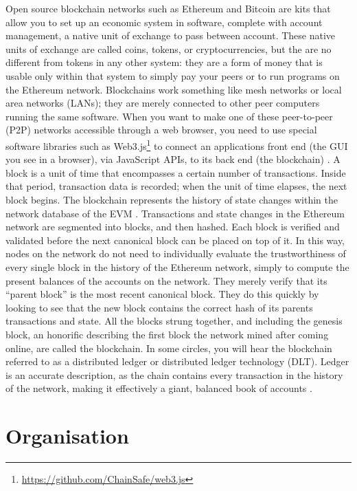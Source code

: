 Open source blockchain networks such as Ethereum and Bitcoin are kits that allow you to set up an economic system in software, complete with account management, a native unit of exchange to pass between account. These native units of exchange are called coins, tokens, or cryptocurrencies, but the are no different from tokens in any other system: they are a form of money  that is usable only within that system to simply pay your peers or to run programs on the Ethereum network. Blockchains work something like mesh networks or local area networks (LANs); they are merely connected to other peer computers running the same software. When you want to make one of these peer-to-peer (P2P) networks accessible through a web browser, you need to use special software libraries such as Web3.js\footnote{\url{https://github.com/ChainSafe/web3.js}} to connect an applications front end (the GUI you see in a browser), via JavaScript APIs, to its back end (the blockchain) \cite[2]{dannen2017introducing}. A block is a unit of time that encompasses a certain number of transactions. Inside that period, transaction data is recorded; when the unit of time elapses, the next block begins. The blockchain represents the history of state changes within the network database of the EVM \cite[43]{dannen2017introducing}.
Transactions and state changes in the Ethereum network are segmented into blocks, and then hashed. Each block is verified and validated before the next canonical block can be placed on top of it. In this way, nodes on the network do not need to individually evaluate the trustworthiness of every single block in the history of the Ethereum network, simply to compute the present balances of the accounts on the network. They merely verify that its “parent block” is the most recent canonical block. They do this quickly by looking to see that the new block contains the correct hash of its parents transactions and state. All the blocks strung together, and including the genesis block, an honorific describing the first block the network mined after coming online, are called the blockchain. In some circles, you will hear the blockchain referred to as a distributed ledger or distributed ledger technology (DLT). Ledger is an accurate description, as the chain contains every transaction in the history of the network, making it effectively a giant, balanced book of accounts \cite[55]{dannen2017introducing}. 
\section{Organisation}
